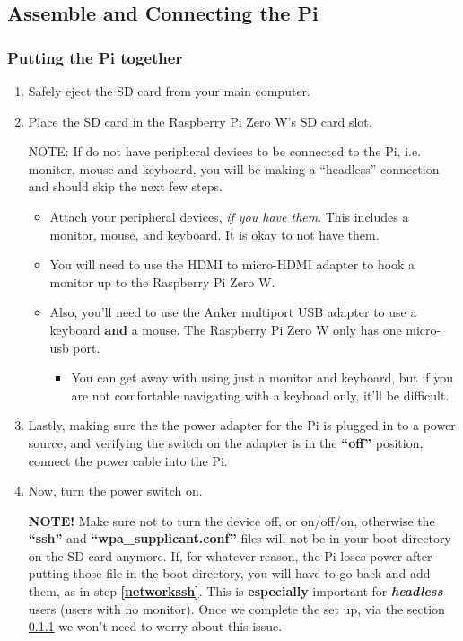 \documentclass{article}
\begin{document}
\subsection{Assemble and Connecting the Pi}

\subsubsection{Putting the Pi together}

\begin{enumerate}
  \item Safely eject the SD card from your main computer.
  \item Place the SD card in the Raspberry Pi Zero W's SD card slot.
  
NOTE: If do not have peripheral devices to be connected to the Pi, i.e. monitor, mouse and keyboard, you will be making a ``headless'' connection and should skip the next few steps. 
\begin{itemize}
  \item Attach your peripheral devices, \textit{if you have them}. This includes a monitor, mouse, and keyboard. It is okay to not have them.
    \item You will need to use the HDMI to micro-HDMI adapter to hook a monitor up to the Raspberry Pi Zero W.
    \item Also, you'll need to use the Anker multiport USB adapter to use a keyboard \textbf{and} a mouse. The Raspberry Pi Zero W only has one micro-usb port.
    \begin{itemize}
     \item You can get away with using just a monitor and keyboard, but if you are not comfortable navigating with a keyboad only, it'll be difficult.
    \end{itemize}
  \end{itemize}
  
  
\item Lastly, making sure the the power adapter for the Pi is plugged in to a power source, and verifying the switch on the adapter is in the \textbf{``off''} position, connect the power cable into the Pi.
  \item Now, turn the power switch on.

\textbf{NOTE!} Make sure not to turn the device off, or on/off/on, otherwise the \textbf{``ssh''} and \textbf{``wpa\_supplicant.conf''} files will not be in your boot directory on the SD card anymore. If, for whatever reason, the Pi loses power after putting those file in the boot directory, you will have to go back and add them, as in step \textbf{\ref{networkssh}}. This is \textbf{especially} important for \textbf{\textit{headless}} users (users with no monitor). Once we complete the set up, via the section \ref{} we won't need to worry about this issue. 


\end{enumerate}
\end{document}
